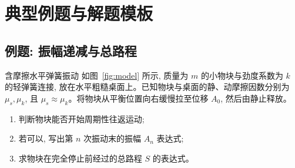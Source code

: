 \documentclass[a4paper,11pt]{ctexart}
\begin{document}
\section{典型例题与解题模板}

\subsection{例题: 振幅递减与总路程}

\begin{examplebox}{含摩擦水平弹簧振动}
如图~\ref{fig:model} 所示, 质量为 $m$ 的小物块与劲度系数为 $k$ 的轻弹簧连接, 放在水平粗糙桌面上。已知物块与桌面的静、动摩擦因数分别为 $\mu_s,\mu_k$, 且 $\mu_s \approx \mu_k$。将物块从平衡位置向右缓慢拉至位移 $A_0$, 然后由静止释放。

\begin{enumerate}
  \item 判断物块能否开始周期性往返运动;
  \item 若可以, 写出第 $n$ 次振动末的振幅 $A_n$ 表达式;
  \item 求物块在完全停止前经过的总路程 $S$ 的表达式。
\end{enumerate}
\end{examplebox}
\end{document}
